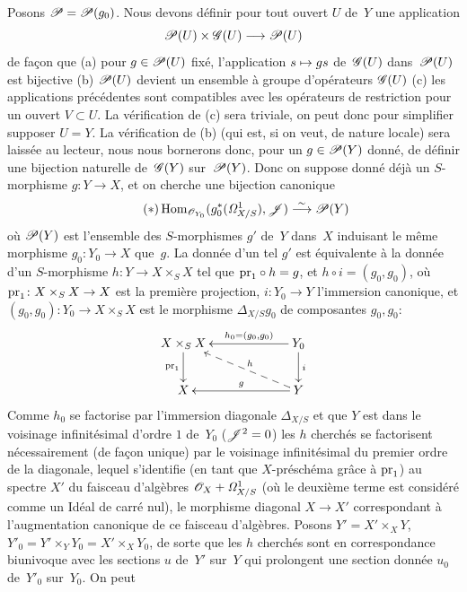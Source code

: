 Posons $\cal{P}=\cal{P}(g_0)$. Nous devons d\'efinir pour tout
ouvert $U$ de~$Y$ une application
$$
\cal{P}(U)\times \cal{G}(U)\to \cal{P}(U)
$$
de fa\c con que (a) pour $g\in \cal{P}(U)$ fix\'e, l'application
$s\mto gs$ de~$\cal{G}(U)$ dans~$\cal{P}(U)$ est bijective (b)
$\cal{P}(U)$ devient un ensemble \`a groupe d'op\'erateurs
$\cal{G}(U)$ (c) les applications pr\'ec\'edentes sont compatibles
avec les op\'erateurs de restriction pour un ouvert $V\subset U$. La
v\'erification de (c) sera triviale, on peut donc pour simplifier
supposer $U=Y$. La v\'erification de (b) (qui est, si on veut, de
nature locale) sera laiss\'ee au lecteur, nous nous bornerons donc,
pour un $g\in \cal{P}(Y)$ donn\'e, de d\'efinir une bijection
naturelle de~$\cal{G}(Y)$ sur~$\cal{P}(Y)$. Donc on suppose donn\'e
d\'ej\`a un $S$-morphisme $g\colon Y\to X$, et on cherche une
bijection canonique
\begin{equation*}
\label{eq:III.5.1.*}
\tag{$*$}
\Hom_{\cal{O}_{Y_0}}(g_0^*(\it{\Omega}^1_{X/S}),\cal{J})\isomto
\cal{P}(Y)
\end{equation*}
o\`u $\cal{P}(Y)$ est l'ensemble des $S$-morphismes $g'$ de~$Y$
dans~$X$ induisant le m\^eme morphisme $g_0\colon Y_0\to X$ que~$g$.
La donn\'ee d'un tel $g'$ est \'equivalente \`a la donn\'ee
d'un $S$-morphisme $h\colon Y\to X\times_S X$ tel que
${\mathrm{pr}}_1\circ h=g$, et $h\circ i=(g_0,g_0)$, o\`u
${\pr}_1\colon X\times_S X \to X$
est la premi\`ere projection, $i\colon Y_0\to Y$ l'immersion
canonique, et $(g_0,g_0)\colon Y_0\to X\times_S X$ est le morphisme
$\Delta_{X/S}g_0$ de
composantes
$g_0,g_0$:
$$
\xymatrix@C=2.2cm{{X\times_S X}\ar[d]_{{\pr}_1}&{Y_0}\ar[l]_-{h_0=(g_0,g_0)}\ar[d]^i\\{X}&{Y}\ar[l]_-g\ar@{-->}[lu]_-h}
$$
Comme $h_0$ se factorise par l'immersion diagonale $\Delta_{X/S}$ et
que $Y$ est dans le voisinage infinit\'esimal d'ordre $1$ de~$Y_0$
(\ie $\cal{J}^2=0$) les $h$ cherch\'es se factorisent
n\'ecessairement (de fa\c con unique) par le voisinage
infinit\'esimal du premier ordre de la diagonale, lequel s'identifie
(en tant que $X$-pr\'esch\'ema gr\^ace \`a ${\mathrm{pr}}_1$)
au spectre $X'$ du faisceau d'alg\`ebres
$\cal{O}_X+\it{\Omega}^1_{X/S}$ (o\`u le deuxi\`eme terme est
consid\'er\'e comme un Id\'eal de carr\'e nul), le morphisme
diagonal $X\to X'$ correspondant \`a l'augmentation canonique de ce
faisceau d'alg\`ebres. Posons $Y'=X'\times_X Y$, $Y'_0=Y'\times_Y
Y_0=X'\times_X Y_0$, de sorte que les $h$ cherch\'es sont en
correspondance biunivoque avec les sections $u$ de~$Y'$ sur~$Y$ qui
prolongent une section donn\'ee $u_0$ de~$Y'_0$ sur~$Y_0$. On peut

